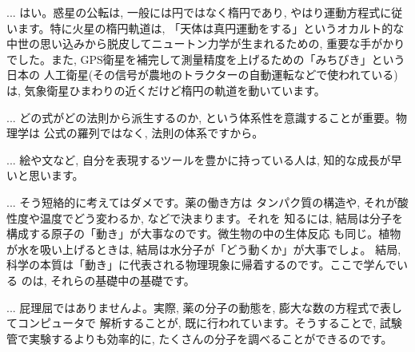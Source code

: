 \begin{faq}{\small{} ... 
はい。惑星の公転は, 一般には円ではなく楕円であり, やはり運動方程式に従います。特に火星の楕円軌道は, 
「天体は真円運動をする」というオカルト的な中世の思い込みから脱皮してニュートン力学が生まれるための, 
重要な手がかりでした。また, GPS衛星を補完して測量精度を上げるための「みちびき」という日本の
人工衛星(その信号が農地のトラクターの自動運転などで使われている)は, 
気象衛星ひまわりの近くだけど楕円の軌道を動いています。}\end{faq}\mv

\begin{faq}{\small{} ... 
どの式がどの法則から派生するのか, という体系性を意識することが重要。物理学は
公式の羅列ではなく, 法則の体系ですから。}\end{faq}\mv

\begin{faq}{\small{} ... 
絵や文など, 自分を表現するツールを豊かに持っている人は, 
知的な成長が早いと思います。}\end{faq}\mv

\begin{faq}{\small{} ... そう短絡的に考えてはダメです。薬の働き方は
タンパク質の構造や, それが酸性度や温度でどう変わるか, などで決まります。それを
知るには, 結局は分子を構成する原子の「動き」が大事なのです。微生物の中の生体反応
も同じ。植物が水を吸い上げるときは, 結局は水分子が「どう動くか」が大事でしょ。
結局, 科学の本質は「動き」に代表される物理現象に帰着するのです。ここで学んでいる
のは, それらの基礎中の基礎です。}\end{faq}\mv

\begin{faq}{\small{} ... 
屁理屈ではありませんよ。実際, 薬の分子の動態を, 膨大な数の方程式で表してコンピュータで
解析することが, 既に行われています。そうすることで, 試験管で実験するよりも効率的に, 
たくさんの分子を調べることができるのです。}\end{faq}\mv
\hv

